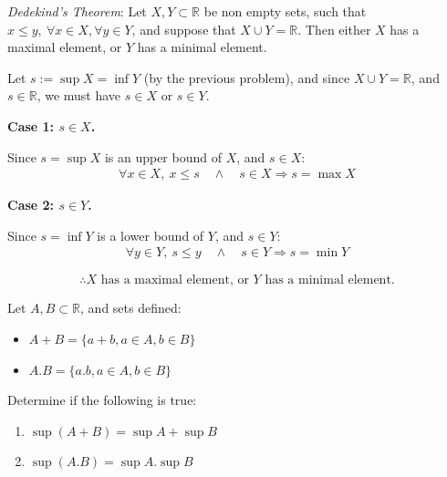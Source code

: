 \begin{problem}
\textit{Dedekind's Theorem}: Let $X, Y \subset \mathbb{R}$ be non empty sets, such that
$x \leq y, \ \forall x \in X, \forall y \in Y$, and suppose that
$X \cup Y = \mathbb{R}$. Then either $X$ has a maximal element, or $Y$ has a minimal element.
\end{problem}

\begin{solution}
Let $s := \sup X = \inf Y$ (by the previous problem), and since $X \cup Y = \mathbb{R}$, and $s \in \mathbb{R}$, we must have $s \in X$ or $s \in Y$.

\textbf{Case 1: $s \in X$.}

Since $s = \sup X$ is an upper bound of $X$, and $s \in X$:
\begin{align*}
\forall x \in X, \ x \leq s \quad \wedge \quad s \in X \Rightarrow s = \max X
\end{align*}

\textbf{Case 2: $s \in Y$.}

Since $s = \inf Y$ is a lower bound of $Y$, and $s \in Y$:
\begin{align*}
\forall y \in Y, \ s \leq y \quad \wedge \quad s \in Y \Rightarrow s = \min Y
\end{align*}

$$\therefore X \text{ has a maximal element, or } Y \text{ has a minimal element.}$$
\end{solution}

\begin{problem}
Let $A, B \subset \mathbb{R}$, and sets defined:

\begin{itemize}
\item $A + B = \{a + b, a \in A, b \in B\}$
\item $A . B = \{a . b, a \in A, b \in B\}$
\end{itemize}

Determine if the following is true:

\begin{enumerate}[label=\roman*)]
\item $\sup{(A + B)} = \sup{A} + \sup{B}$
\item $\sup{(A . B)} = \sup{A} . \sup{B}$
\end{enumerate}
\end{problem}

